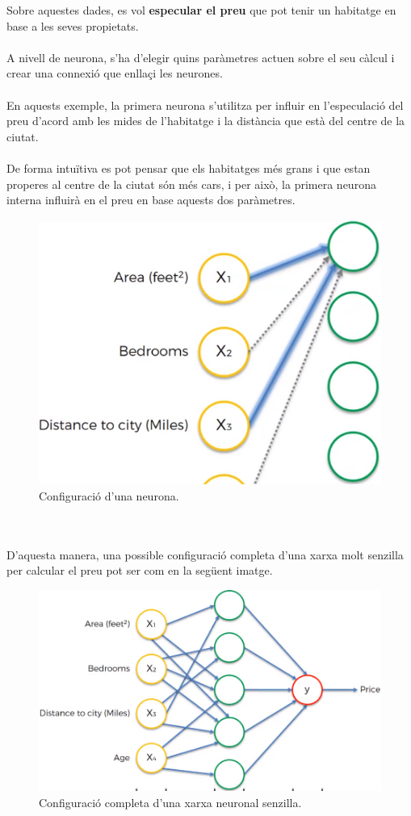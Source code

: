 \documentclass[12pt]{article}
\begin{document}
Sobre aquestes dades, es vol \textbf{especular el preu} que pot tenir un habitatge en base a les seves propietats.
\\\\A nivell de neurona, s'ha d'elegir quins paràmetres actuen sobre el seu càlcul i crear una connexió que enllaçi les neurones. 
\\\\En aquests exemple, la primera neurona s'utilitza per influir en l'especulació del preu d'acord amb les mides de l'habitatge i la distància que està del centre de la ciutat. 
\\\\De forma intuïtiva es pot pensar que els habitatges més grans i que estan properes al centre de la ciutat són més cars, i per això, la primera neurona interna influirà en el preu en base aquests dos paràmetres.
\begin{figure}[h!]
	\centering
	\includegraphics[scale=0.3]{imatges/funcionament/1basic.png}
	\caption{Configuració d'una neurona.}
\end{figure}
\pagebreak
\\\\D'aquesta manera, una possible configuració completa d'una xarxa molt senzilla per calcular el preu pot ser com en la següent imatge.
\begin{figure}[h!]
	\centering
	\includegraphics[scale=0.3]{imatges/funcionament/2completa.png}
	\caption{Configuració completa d'una xarxa neuronal senzilla.}
\end{figure}
\end{document}
